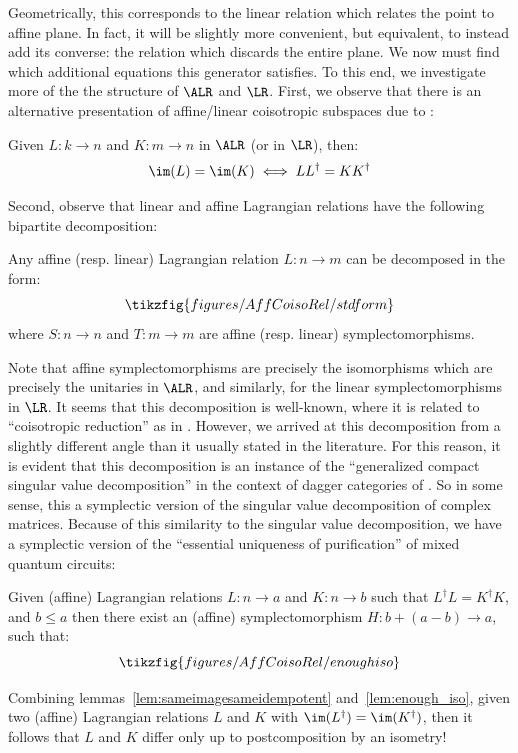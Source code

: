 Geometrically, this corresponds to the linear relation which relates the point to affine plane.  In fact, it will be slightly more convenient, but equivalent, to instead add its converse: the relation which discards the entire plane.
We  now must find which additional equations this generator satisfies.  To this end, we investigate more of the the structure of \(\ALR\) and \(\LR\).
First, we observe that there is an alternative presentation of affine/linear coisotropic subspaces due to \textcite[Theorem 4.5]{comfort_algebra_2023}:
\begin{lemma}
\label{lem:sameimagesameidempotent}
Given  \(L:k\to n\) and \(K:m\to n\) in \(\ALR\) (or in \(\LR\)), then:
\[ \im(L)= \im(K) \iff L L^\dag     = K K^\dag  \]
\end{lemma}
Second, observe that linear and affine Lagrangian relations have the following bipartite decomposition:
\begin{lemma}
\label{lem:decomposition}
  Any affine (resp. linear) Lagrangian relation \(L:n\to m\) can be decomposed in the form:
  \[\tikzfig{figures/AffCoisoRel/stdform}\]
  where \(S:n\to n \) and \(T: m \to m\) are affine (resp. linear) symplectomorphisms.
\end{lemma}
Note that affine symplectomorphisms are precisely the isomorphisms which are precisely the unitaries in \(\ALR\), and similarly, for the linear symplectomorphisms in \(\LR\).
It seems that this decomposition is well-known, where it is related to ``coisotropic reduction'' as in \textcite[section~3.1]{weinstein_symplectic_2009}.
However, we arrived at this decomposition from a slightly different angle than it usually stated in the literature. 
For this reason, it is evident that this decomposition is an instance of the ``generalized compact singular value decomposition'' in the context of dagger categories of \textcite[definition~3.5]{MPI}.  So in some sense, this a symplectic version of the singular value decomposition of complex matrices.  Because of this similarity to the singular value decomposition, we have a symplectic version of the ``essential uniqueness of purification'' of mixed quantum circuits:
\begin{lemma}\label{lem:enough_iso}
	Given (affine) Lagrangian relations \(L:n \to a\) and \(K:n \to b\) such that  \(L^\dagger  L = K^\dagger  K\), and \(b\leq a\) then there exist an (affine) symplectomorphism \(H: b+ (a-b)\to a\), such that:
	\[\tikzfig{figures/AffCoisoRel/enoughiso}\]
\end{lemma}
Combining lemmas~\ref{lem:sameimagesameidempotent} and~\ref{lem:enough_iso}, given two (affine) Lagrangian relations \(L\) and \(K\) with \(\im(L^\dag)=\im(K^\dag)\), then it follows that \(L\) and \(K\) differ only up to postcomposition by an isometry!
